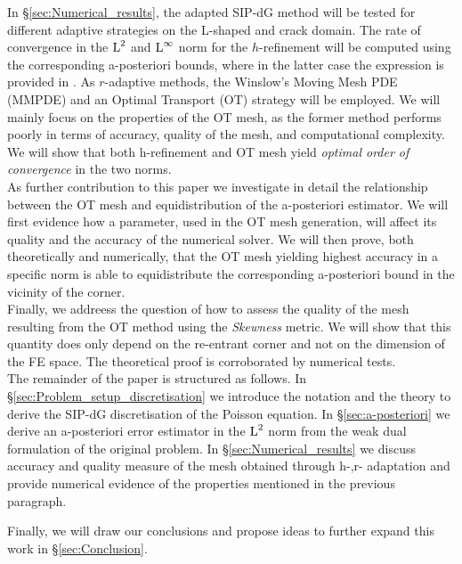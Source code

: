 \documentclass[a4paper,11pt]{article}
\begin{document}
{\begin{itemize}
\end{itemize}

In \S \ref{sec:Numerical_results}, the adapted SIP-dG method will be tested for different adaptive strategies on the L-shaped and crack domain. The rate of convergence in the $\operatorname L^{2}$ and $\operatorname L^{\infty}$ norm for the $h$-refinement will be computed using the corresponding a-posteriori bounds, where in the latter case the expression is provided in \cite{DG:2012}. As $r$-adaptive methods, the Winslow's Moving Mesh PDE (MMPDE) and an Optimal Transport (OT) strategy will be employed. We will mainly focus on the properties of the OT mesh, as the former method performs poorly in terms of accuracy, quality of the mesh, and computational complexity. We will show that both h-refinement and OT mesh yield \textit{optimal order of convergence} in the two norms. \\

As further contribution to this paper we investigate in detail the relationship between the OT mesh and equidistribution of the a-posteriori estimator. We will first evidence how a parameter, used in the OT mesh generation, will affect its quality and the accuracy of the numerical solver. We will then prove, both theoretically and numerically, that the OT mesh yielding highest accuracy in a specific norm is able to equidistribute the corresponding a-posteriori bound in the vicinity of the corner.\\

Finally, we addreess the question of how to assess the quality of the mesh resulting from the OT method using the \textit{Skewness} metric. We will show that this quantity does only depend on the re-entrant corner and not on the dimension of the FE space. The theoretical proof is corroborated by numerical tests.\\

The remainder of the paper is structured as follows. In \S \ref{sec:Problem_setup_discretisation} we introduce the notation and the theory to derive the SIP-dG discretisation of the Poisson equation. In \S \ref{sec:a-posteriori} we derive an a-posteriori error estimator in the $\operatorname L^{2}$ norm from the weak dual formulation of the original problem. In \S \ref{sec:Numerical_results} we discuss accuracy and quality measure of the mesh obtained through h-,r- adaptation and provide numerical evidence of the properties mentioned in the previous paragraph.

Finally, we will draw our conclusions and propose ideas to further expand this work in \S \ref{sec:Conclusion}.

}
\end{document}
